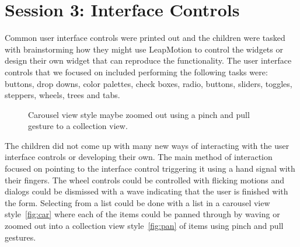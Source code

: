 
\section{Session 3: Interface Controls}\label{session3}

Common user interface controls were printed out and the children were tasked with brainstorming how they might use LeapMotion to control the widgets or design their own widget that can reproduce the functionality. The user interface controls that we focused on included performing the following tasks were: buttons, drop downs, color palettes, check boxes, radio, buttons, sliders, toggles, steppers, wheels, trees and tabs.


\begin{figure}
\centering     %
{}
\caption{Carousel view style maybe zoomed out using a pinch and pull gesture to a collection view. }
\label{fig:collectionview}
\end{figure}
The children did not come up with many new ways of interacting with the user interface controls or developing their own. The main method of interaction focused on pointing to the interface control triggering it using a hand signal with their fingers. The wheel controls could be controlled with flicking motions and dialogs could be dismissed with a wave indicating that the user is finished with the form. Selecting from a list could be done with a list in a carousel view style~\ref{fig:car} where each of the items could be panned through by waving or zoomed out into a collection view style~\ref{fig:pan} of items using pinch and pull gestures. 

